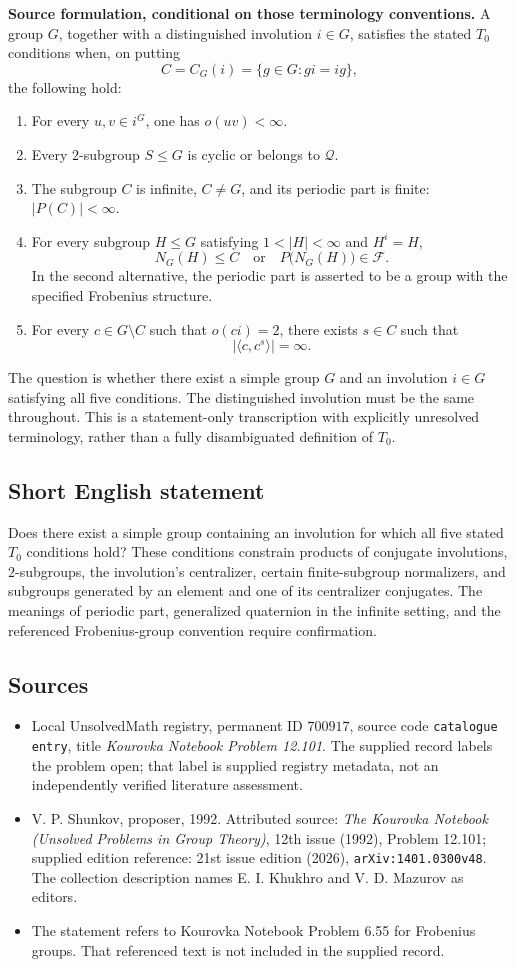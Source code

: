 \documentclass[11pt]{article}
\begin{document}
\textbf{Source formulation, conditional on those terminology conventions.} A group \(G\), together with a distinguished involution \(i\in G\), satisfies the stated \(T_0\) conditions when, on putting
\[
C=C_G(i)=\{g\in G:gi=ig\},
\]
the following hold:
\begin{enumerate}
\item For every \(u,v\in i^G\), one has \(o(uv)<\infty\).
\item Every \(2\)-subgroup \(S\leq G\) is cyclic or belongs to \(\mathcal Q\).
\item The subgroup \(C\) is infinite, \(C\ne G\), and its periodic part is finite: \(|P(C)|<\infty\).
\item For every subgroup \(H\leq G\) satisfying \(1<|H|<\infty\) and \(H^i=H\),
\[
N_G(H)\leq C
\quad\text{or}\quad
P\bigl(N_G(H)\bigr)\in\mathcal F.
\]
In the second alternative, the periodic part is asserted to be a group with the specified Frobenius structure.
\item For every \(c\in G\setminus C\) such that \(o(ci)=2\), there exists \(s\in C\) such that
\[
\bigl|\langle c,c^s\rangle\bigr|=\infty.
\]
\end{enumerate}
The question is whether there exist a simple group \(G\) and an involution \(i\in G\) satisfying all five conditions. The distinguished involution must be the same throughout. This is a statement-only transcription with explicitly unresolved terminology, rather than a fully disambiguated definition of \(T_0\).
\subsection{Short English statement}
Does there exist a simple group containing an involution for which all five stated \(T_0\) conditions hold? These conditions constrain products of conjugate involutions, \(2\)-subgroups, the involution's centralizer, certain finite-subgroup normalizers, and subgroups generated by an element and one of its centralizer conjugates. The meanings of periodic part, generalized quaternion in the infinite setting, and the referenced Frobenius-group convention require confirmation.
\subsection{Sources}
\begin{itemize}
\item Local UnsolvedMath registry, permanent ID \(700917\), source code \texttt{catalogue entry}, title \emph{Kourovka Notebook Problem 12.101}. The supplied record labels the problem open; that label is supplied registry metadata, not an independently verified literature assessment.
\item V. P. Shunkov, proposer, 1992. Attributed source: \emph{The Kourovka Notebook (Unsolved Problems in Group Theory)}, 12th issue (1992), Problem 12.101; supplied edition reference: 21st issue edition (2026), \texttt{arXiv:1401.0300v48}. The collection description names E. I. Khukhro and V. D. Mazurov as editors.
\item The statement refers to Kourovka Notebook Problem 6.55 for Frobenius groups. That referenced text is not included in the supplied record.
\end{itemize}
\end{document}
